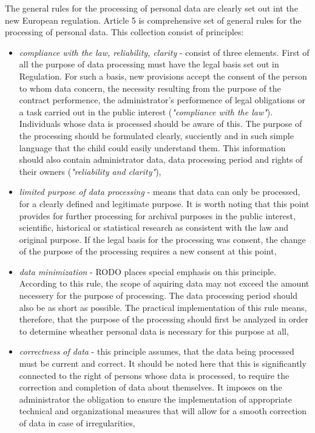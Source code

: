 \documentclass[en, noamssymb]{mgr}
\begin{document}
The general rules for the processing of personal data are clearly set out int the new European regulation. Article 5 is comprehensive set of general rules for the processing of personal data. This collection consist of principles:
\begin{itemize}

\item \textit{compliance with the law, reliability, clarity} - consist of three elements. First of all the purpose of data processing must have the legal basis set out in Regulation. For such a basis, new provisions accept the consent of the person to whom data concern, the necessity resulting from the purpose of the contract performence, the administrator's performence of legal obligations or a task carried out in the public interest (\textit{"compliance with the law"}). Individuals whose data is processed should be aware of this. The purpose of the processing should be formulated clearly, succiently and in such simple language that the child could easily understand them. This information should also contain administrator data, data processing period and rights of their owners (\textit{"reliability and clarity"}),

\item \textit{limited purpose of data processing} - means that data can only be processed, for a clearly defined and legitimate purpose. It is worth noting that this point provides for further processing for archival purposes in the public interest, scientific, historical or statistical research as consistent with the law and original purpose. If the legal basis for the processing was consent, the change of the purpose of the processing requires a new consent at this point,

\item \textit{data minimization} - RODO places special emphasis on this principle. According to this rule, the scope of aquiring data may not exceed the amount necessery for the purpose of processing. The data processing period should also be as short as possible. The practical implementation of this rule means, therefore, that the purpose of the processing should first be analyzed in order to determine wheather personal data is necessary for this purpose at all,

\item \textit{correctness of data} - this principle assumes, that the data being processed must be current and correct. It should be noted here that this is significantly connected to the right of persons whose data is processed, to require the correction and completion of data about themselves. It imposes on the administrator the obligation to ensure the implementation of appropriate technical and organizational measures that will allow for a smooth correction of data in case of irregularities,


\end{itemize}
\end{document}

